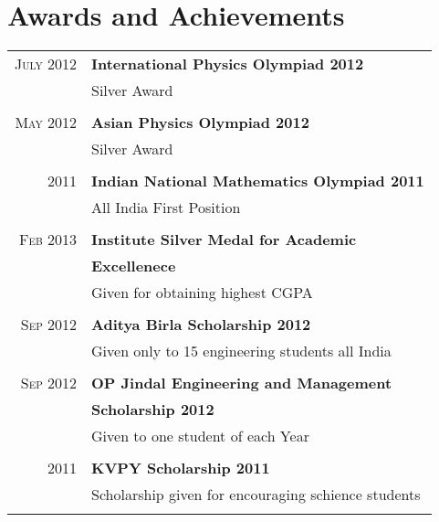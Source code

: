 \documentclass[10pt]{article} %
\begin{document}
{\begin{minipage}[t]{0.5\textwidth}
\section{Awards and Achievements} 
\begin{tabular}{rl}
\textsc{July 2012} & \textbf{International Physics Olympiad 2012}\\
& Silver Award\\\\
\textsc{May 2012} & \textbf{Asian Physics Olympiad 2012}\\
& Silver Award\\\\
\textsc{2011} & \textbf{Indian National Mathematics Olympiad 2011}\\
& All India First Position \\\\
\textsc{Feb 2013} & \textbf{Institute Silver Medal for Academic}\\ &  {\bf Excellenece }\\
& Given for obtaining highest CGPA\\\\
\textsc{Sep 2012} & \textbf{Aditya Birla Scholarship 2012}\\
& Given only to 15 engineering students all India\\\\
\textsc{Sep 2012} & \textbf{OP Jindal Engineering and Management }\\ & \textbf{ Scholarship 2012}\\
& Given to one student of each Year\\\\
\textsc{2011} & \textbf{KVPY Scholarship 2011}\\
& Scholarship given for encouraging schience students \\\\
\end{tabular}\\[10pt]

\end{minipage} %
\hfill
\begin{minipage}[t]{0.44\textwidth} %
\vspace{0pt} %



\end{minipage}}
\end{document}
